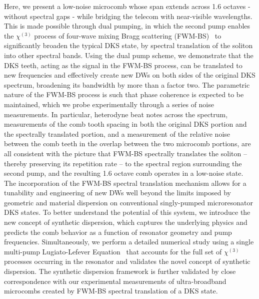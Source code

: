 \documentclass[reprint,superscriptaddress, amsmath,amssymb,pra, aps,floatfix,longbibliography]{revtex4-1}
\begin{document}
{\indent}Here, we present a low-noise microcomb whose span extends across 1.6 octaves - without spectral gaps - while bridging the telecom with near-visible wavelengths. This is made possible through dual pumping, in which the  second pump enables the $\chi^{(3)}$ process of four-wave mixing Bragg scattering (FWM-BS)~\cite{yulin_four-wave_2004,xu_cascaded_2013,li_efficient_2016} to significantly broaden the typical DKS state, by spectral translation of the soliton into other spectral bands. Using the dual pump scheme, we demonstrate that the DKS teeth, acting as the signal in the FWM-BS process, can be translated to new frequencies and effectively create new DWs on both sides of the original DKS spectrum, broadening its bandwidth by more than a factor two. The parametric nature of the FWM-BS process is such that phase coherence is expected to be maintained, which we probe experimentally through a series of noise measurements. In particular, heterodyne beat notes across the spectrum, measurements of the comb tooth spacing in both the original DKS portion and the spectrally translated portion, and a measurement of the relative noise between the comb teeth in the overlap between the two microcomb portions, are all consistent with the picture that FWM-BS spectrally translates the soliton -- thereby preserving its repetition rate -- to the spectral region surrounding the second pump, and the resulting 1.6 octave comb operates in a low-noise state. The incorporation of the FWM-BS spectral translation mechanism allows for a tunability and engineering of new DWs well beyond the limits imposed by geometric and material dispersion on conventional singly-pumped microresonator DKS states. To better understand the potential of this system, we introduce the new concept of synthetic dispersion, which captures the underlying physics and predicts the comb behavior as a function of resonator geometry and pump frequencies. Simultaneously, we perform a detailed numerical study using a single multi-pump Lugiato-Lefever Equation~\cite{chembo_spatiotemporal_2013,taheri_optical_2017} that accounts for the full set of $\chi^{(3)}$ processes occurring in the resonator and validates the novel concept of synthetic dispersion. The synthetic dispersion framework is further validated by close correspondence with our experimental measurements of ultra-broadband microcombs created by FWM-BS spectral translation of a DKS state.
\end{document}
